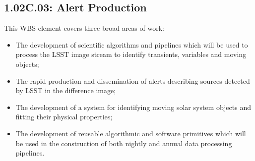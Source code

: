 \subsection*{1.02C.03: Alert Production}

This WBS element covers three broad areas of work:

\begin{itemize}

  \item{The development of scientific algorithms and pipelines which will be
  used to process the LSST image stream to identify transients, variables and
  moving objects;}

  \item{The rapid production and dissemination of alerts describing
  sources detected by LSST in the difference image;}

  \item{The development of a system for identifying moving solar system
  objects and fitting their physical properties;}

  \item{The development of reusable algorithmic and software primitives which
  will be used in the construction of both nightly and annual data processing
  pipelines.}

\end{itemize}
